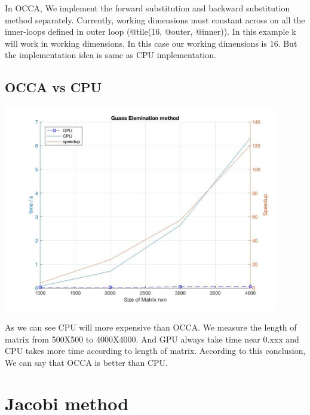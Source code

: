 In OCCA, We implement the forward substitution and backward substitution method separately. Currently, working dimensions must constant across on all the inner-loops defined in outer loop (@tile(16, @outer, @inner)). In this example k will work in working dimensions. In this case our working dimensions is 16. But the implementation idea is same as CPU implementation.

\section{OCCA vs CPU}
\begin{center}
	\includegraphics[width = 12cm]{Chapters/guass_elimination.jpg}
\end{center}

As we can see CPU will more expensive than OCCA. We measure the length of matrix from 500X500 to 4000X4000. And GPU always take time near 0.xxx and CPU takes more time according to length of matrix. According to this conclusion, We can say that OCCA is better than CPU. 


\chapter{Jacobi method}
